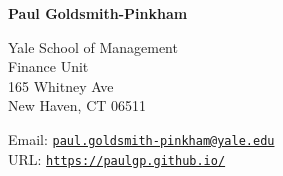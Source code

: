 \documentclass[letterpaper]{article}
\begin{document}
{\huge\bf  Paul Goldsmith-Pinkham}

\bigskip

Yale School of Management\\
Finance Unit\\
165 Whitney Ave\\
New Haven, CT 06511
\medskip



Email: \href{mailto:paul.goldsmith-pinkham@yale.edu}{\tt paul.goldsmith-pinkham@yale.edu} \\
URL: \href{http://https://paulgp.github.io//}{\tt https://paulgp.github.io/}

\end{document}
